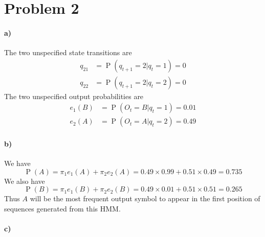 \documentclass[12pt]{article}
\begin{document}
\section*{Problem 2}

\paragraph{a)}

The two unspecified state transitions are
\begin{align*}
        q_{21}&=\operatorname{P}(q_{t+1}=2|q_t=1)=0\\
        q_{22}&=\operatorname{P}(q_{t+1}=2|q_t=2)=0
\end{align*}
The two unspecified output probabilities are
\begin{align*}
        e_1(B)&=\operatorname{P}(O_t=B|q_t=1)=0.01\\
        e_2(A)&=\operatorname{P}(O_t=A|q_t=2)=0.49
\end{align*}

\paragraph{b)}

We have
\[\operatorname{P}(A)=\pi_1e_1(A)+\pi_2e_2(A)=0.49\times0.99+0.51\times0.49=0.735\]
We also have
\[\operatorname{P}(B)=\pi_1e_1(B)+\pi_2e_2(B)=0.49\times0.01+0.51\times0.51=0.265\]
Thus \(A\) will be the most frequent output symbol to appear in the first position of sequences generated from this HMM.

\paragraph{c)}
\end{document}
